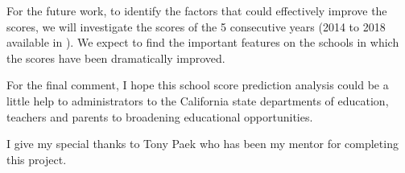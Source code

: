 \documentclass[11pt]{article}
\begin{document}
For the future work,
to identify the factors that could effectively improve the scores, we will investigate the scores of the 5 consecutive years (2014 to 2018 available in \cite{california_dep_education}). 
%
We expect to find the important features on the schools in which the scores have been dramatically improved.
%

For the final comment, I hope this school score prediction analysis could be a little help to administrators to the California state departments of education, teachers and parents to broadening educational opportunities.

I give my special thanks to Tony Paek who has been my mentor for completing this project.

\newpage



%
%
\end{document}
